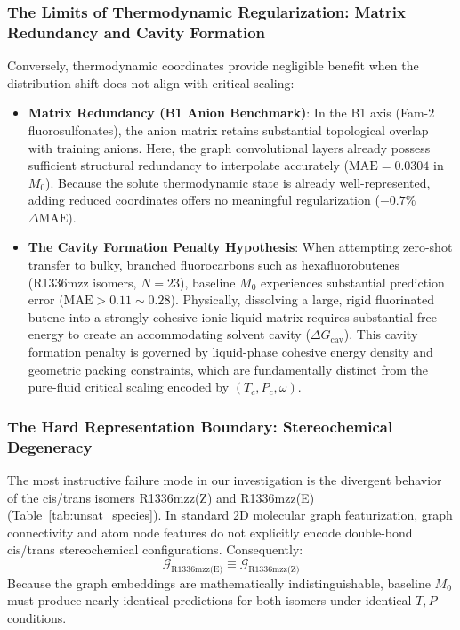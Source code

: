 \subsubsection{The Limits of Thermodynamic Regularization: Matrix Redundancy and Cavity Formation}
Conversely, thermodynamic coordinates provide negligible benefit when the distribution shift does not align with critical scaling:
\begin{itemize}
    \item \textbf{Matrix Redundancy (B1 Anion Benchmark)}: In the B1 axis (Fam-2 fluorosulfonates), the anion matrix retains substantial topological overlap with training anions. Here, the graph convolutional layers already possess sufficient structural redundancy to interpolate accurately ($\text{MAE} = 0.0304$ in $M_0$). Because the solute thermodynamic state is already well-represented, adding reduced coordinates offers no meaningful regularization ($-0.7\%$ $\Delta\text{MAE}$).
    \item \textbf{The Cavity Formation Penalty Hypothesis}: When attempting zero-shot transfer to bulky, branched fluorocarbons such as hexafluorobutenes (R1336mzz isomers, $N=23$), baseline $M_0$ experiences substantial prediction error ($\text{MAE} > 0.11\sim0.28$). Physically, dissolving a large, rigid fluorinated butene into a strongly cohesive ionic liquid matrix requires substantial free energy to create an accommodating solvent cavity ($\Delta G_{\mathrm{cav}}$). This cavity formation penalty is governed by liquid-phase cohesive energy density and geometric packing constraints, which are fundamentally distinct from the pure-fluid critical scaling encoded by $(T_c, P_c, \omega)$.
\end{itemize}

\subsubsection{The Hard Representation Boundary: Stereochemical Degeneracy}
The most instructive failure mode in our investigation is the divergent behavior of the cis/trans isomers R1336mzz(Z) and R1336mzz(E) (Table~\ref{tab:unsat_species}). In standard 2D molecular graph featurization, graph connectivity and atom node features do not explicitly encode double-bond cis/trans stereochemical configurations. Consequently:
\begin{equation}
\mathcal{G}_{\text{R1336mzz(E)}} \equiv \mathcal{G}_{\text{R1336mzz(Z)}}
\end{equation}
Because the graph embeddings are mathematically indistinguishable, baseline $M_0$ must produce nearly identical predictions for both isomers under identical $T, P$ conditions.

